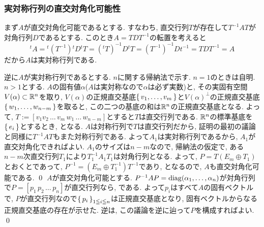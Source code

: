 \subsubsection{実対称行列の直交対角化可能性}
\prf まず$A$が直交対角化可能であるとする. すなわち, 直交行列$T$が存在して$T^{-1}AT$が対角行列$D$であるとする. このとき$A = TDT^{-1}$の転置を考えると
\[{}^t A = {}^t (T^{-1}) {}^t D {}^t T = ({}^t T)^{-1} D {}^t T = (T^{-1})^{-1} D t^{-1} =   TDT^{-1} = A\]
だから$A$は実対称行列である.\par
逆に$A$が実対称行列であるとする. $n$に関する帰納法で示す. $n=1$のときは自明. $n>1$とする.  $A$の固有値$\alpha$($A$は実対称なので$\alpha$は必ず実数)と, その実固有空間$V(\alpha)\subset \mathbb{R}^n$を取り,  $V(\alpha)$の正規直交基底$\set{v_1,\dots, v_m}$と$V(\alpha)^{\bot}$の正規直交基底$\set{w_1,\dots, w_{n-m}}$を取ると, この二つの基底の和は$\mathbb{R}^n$の正規直交基底となる. よって, $T := [v_1 v_2 \, \dots \, v_m\, w_1\, \dots \, w_{n-m}]$とすると$T$は直交行列である. $\mathbb{R}^n$の標準基底を$\set{e_i}$とするとき,
となる. $A$は対称行列で$T$は直交行列だから, 証明の最初の議論と同様に$T^{-1}AT$もまた対称行列である. よって$A_1$は実対称行列であるから, $A_1$が直交対角化できればよい. $A_1$のサイズは$n-m$なので, 帰納法の仮定で, ある$n-m$次直交行列$T_1$により$T_1^{-1}A_1T_1$は対角行列となる. よって, $P = T(E_m \oplus T_1)$とおくとであって, $P^{-1} = (E_m \oplus T_1^{-1})T^{-1}$であり,
となるので, $A$も直交対角化可能である. \qed
{}
\prf $A$が直交対角化可能とする. $P^{-1}AP = \mathrm{diag}(\alpha_1,\dots, \alpha_n)$が対角行列で$P = [p_1\, p_2\, \dots\, p_n]$が直交行列なら, である. よって$p_i$はすべて$A$の固有ベクトルで, $P$が直交行列なので$\set{p_i}_{1\leqq i\leqq n}$は正規直交基底となり, 固有ベクトルからなる正規直交基底の存在が示せた. 逆は, この議論を逆に辿って$P$を構成すればよい. \qed

